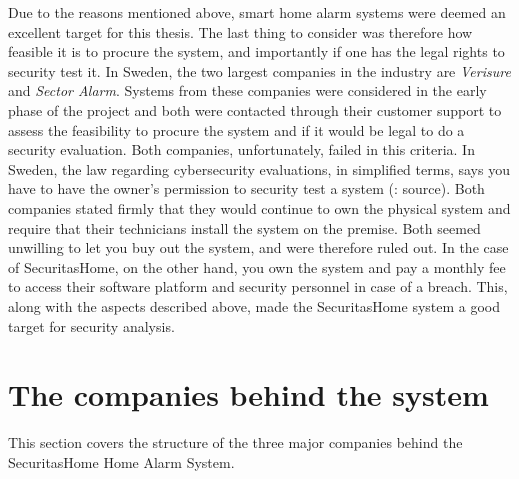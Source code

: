 Due to the reasons mentioned above, smart home alarm systems were deemed an excellent target for this thesis. The last thing to consider was therefore how feasible it is to procure the system, and importantly if one has the legal rights to security test it. In Sweden, the two largest companies in the industry are \textit{Verisure} and \textit{Sector Alarm}. Systems from these companies were considered in the early phase of the project and both were contacted through their customer support to assess the feasibility to procure the system and if it would be legal to do a security evaluation. Both companies, unfortunately, failed in this criteria. In Sweden, the law regarding cybersecurity evaluations, in simplified terms, says you have to have the owner's permission to security test a system (\todo: source). Both companies stated firmly that they would continue to own the physical system and require that their technicians install the system on the premise. Both seemed unwilling to let you buy out the system, and were therefore ruled out. In the case of SecuritasHome, on the other hand, you own the system and pay a monthly fee to access their software platform and security personnel in case of a breach. This, along with the aspects described above, made the SecuritasHome system a good target for security analysis.

\section{The companies behind the system} \label{ch:system:companies}
This section covers the structure of the three major companies behind the SecuritasHome Home Alarm System.

